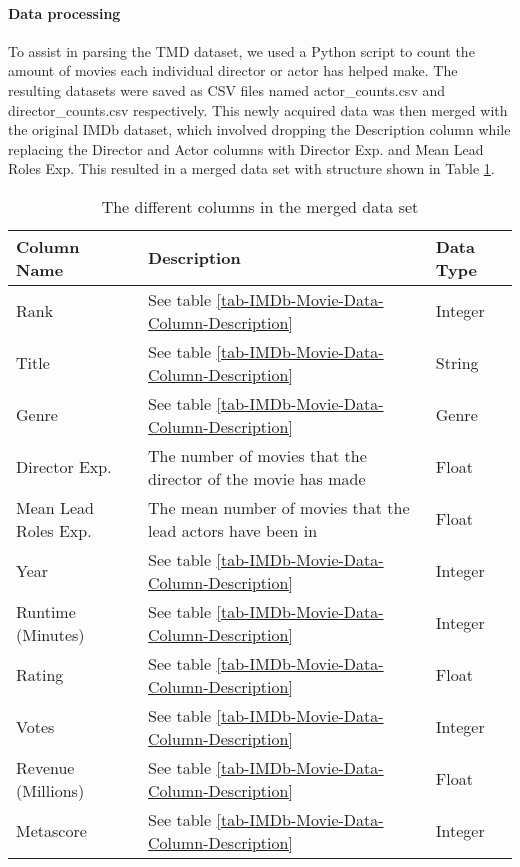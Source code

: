     \paragraph{Data processing}
        To assist in parsing the TMD dataset, we used a Python script to count the
            amount of movies each individual director or actor has helped make.
        The resulting datasets were saved as CSV files named actor\_counts.csv and
            director\_counts.csv respectively.
        This newly acquired data was then merged with the original IMDb dataset, which
            involved dropping the Description column while replacing the Director and Actor
            columns with Director Exp.
        and Mean Lead Roles Exp.
        This resulted in a merged data set with structure shown in Table
            \ref{tab-merged-data-column-description}.
        \begin{table}[h]
            \begin{tabular}{lp{9cm}l}
                \toprule
                Column Name          & Description                                                  & Data Type \\
                \midrule
                Rank                 & See table \ref{tab-IMDb-Movie-Data-Column-Description}       & Integer   \\
                Title                & See table \ref{tab-IMDb-Movie-Data-Column-Description}       & String    \\
                Genre                & See table \ref{tab-IMDb-Movie-Data-Column-Description}       & Genre     \\
                Director Exp.        & The number of movies that the director of the movie has made & Float     \\
                Mean Lead Roles Exp. & The mean number of movies that the lead actors have been in  & Float     \\
                Year                 & See table \ref{tab-IMDb-Movie-Data-Column-Description}       & Integer   \\
                Runtime (Minutes)    & See table \ref{tab-IMDb-Movie-Data-Column-Description}       & Integer   \\
                Rating               & See table \ref{tab-IMDb-Movie-Data-Column-Description}       & Float     \\
                Votes                & See table \ref{tab-IMDb-Movie-Data-Column-Description}       & Integer   \\
                Revenue (Millions)   & See table \ref{tab-IMDb-Movie-Data-Column-Description}       & Float     \\
                Metascore            & See table \ref{tab-IMDb-Movie-Data-Column-Description}       & Integer   \\
                \bottomrule
            \end{tabular}
            \caption[short]{The different columns in the merged data set}\label{tab-merged-data-column-description}
        \end{table}

